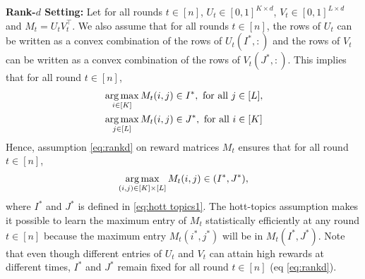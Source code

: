 \textbf{Rank-$d$ Setting:} Let for all rounds $t\in[n]$, $U_t \in [0,1]^{K\times d}$, $V_t \in [0,1]^{L\times d}$ and $M_t = U_t V_t^{\intercal}$. We also assume that for all rounds $t\in [n]$, the rows of $U_t$ can be written as a convex combination of the rows of $U_t(I^\ast, :)$ and the rows of $V_t$ can be written as a convex combination of the rows of $V_t(J^\ast, :)$. This implies that for all round $t\in [n]$,
\begin{align}
& \mathop{\rm arg\,max}_{i\in[K]}M_{t}(i,j) \in I^\ast, \text{ for all $j \in [L]$} , \nonumber\\
& \mathop{\rm arg\,max}_{j\in[L]}M_{t}(i,j)\in J^\ast , \text{ for all $i \in [K]$}\label{eq:rankd}
\end{align}
Hence, assumption \eqref{eq:rankd} on reward matrices $M_t$ ensures that for all round $t \in [n]$,
\begin{align}
  \mathop{\rm arg\,max}_{(i, j) \in [K] \times [L]} M_t(i, j) \in (I^\ast, J^\ast) \label{eq:rewardProp},
\end{align}
where $I^\ast$ and $J^\ast$ is defined in \eqref{eq:hott topics1}. The hott-topics assumption makes it possible to learn the maximum entry of $M_t$ statistically efficiently at any round $t\in[n]$ because the maximum entry $M_t(i^*,j^*)$ will be in $M_t(I^*,J^*)$. Note that even though different entries of $U_t$ and $V_t$ can attain high rewards at different times, $I^*$ and $J^*$ remain fixed for all round $t\in[n]$ (eq \ref{eq:rankd}). 
